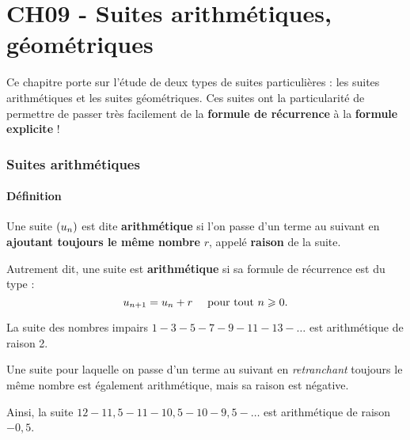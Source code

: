 \documentclass[a4paper,11pt]{article}
\author{Pierquet}
\title{\nomfichier}
\begin{document}
\newcommand{\coord}[3]{\vect{#1}\begin{pmatrix}#2\\#3\end{pmatrix}}

\pagestyle{fancy}

\part{CH09 - Suites arithmétiques, géométriques}

\medskip

\begin{ccadre}
Ce chapitre porte sur l'étude de deux types de suites particulières : les suites arithmétiques et les suites géométriques. Ces suites ont la particularité de permettre de passer très facilement de la \textbf{formule de récurrence} à la \textbf{formule explicite} !
\end{ccadre}

\section{Suites arithmétiques}

\subsection{Définition}

\begin{cdefi}
Une suite $\left( u_n \right)$ est dite \textbf{arithmétique} si l'on passe d'un terme au suivant en \textbf{ajoutant toujours le même nombre} $r$, appelé \textbf{raison} de la suite.

Autrement dit, une suite est \textbf{arithmétique} si sa formule de récurrence est du type : \[u_{n+1}=u_n+r\quad \mbox{ pour tout } n \geqslant 0.\]
\end{cdefi}

\begin{cexemple}
La suite des nombres impairs $1 - 3 - 5 - 7 - 9 - 11 - 13 - \ldots$ est arithmétique de raison 2.
\end{cexemple}

\begin{crmq}
Une suite pour laquelle on passe d'un terme au suivant en \textit{retranchant} toujours le même nombre est également arithmétique, mais sa raison est négative.

Ainsi, la suite $12 - 11,5 - 11 - 10,5 - 10 - 9,5 - \ldots$ est arithmétique de raison $-0,5$.
\end{crmq}
\end{document}
